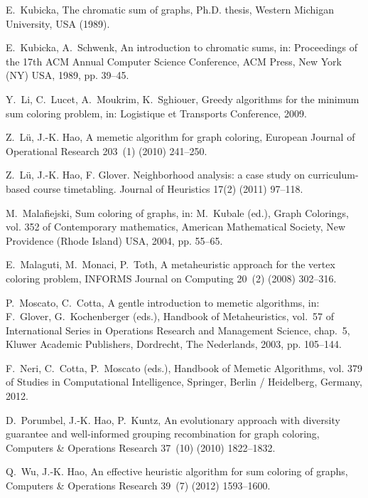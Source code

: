 \documentclass{elsart}
\begin{document}
\begin{thebibliography}{10}
E.~Kubicka, The chromatic sum of graphs, Ph.D. thesis, Western Michigan
  University, USA (1989).

E.~Kubicka, A.~Schwenk, An introduction to chromatic sums, in: Proceedings of
  the 17th ACM Annual Computer Science Conference, ACM Press, New York (NY)
  USA, 1989, pp. 39--45.

Y.~Li, C.~Lucet, A.~Moukrim, K.~Sghiouer, Greedy algorithms for the minimum sum
  coloring problem, in: Logistique et Transports Conference, 2009.

Z.~L\"u, J.-K. Hao, A memetic algorithm for graph coloring, European Journal of
  Operational Research 203~(1) (2010) 241--250.

Z.~L\"u, J.-K. Hao, F. Glover. Neighborhood analysis: a case study on curriculum-based course timetabling. Journal of Heuristics 17(2) (2011)  97--118.


M.~Malafiejski, Sum coloring of graphs, in: M.~Kubale (ed.), Graph Colorings,
  vol. 352 of Contemporary mathematics, American Mathematical Society, New
  Providence (Rhode Island) USA, 2004, pp. 55--65.

E.~Malaguti, M.~Monaci, P.~Toth, A metaheuristic approach for the vertex
  coloring problem, INFORMS Journal on Computing 20~(2) (2008) 302--316.

P.~Moscato, C.~Cotta, A gentle introduction to memetic algorithms, in:
  F.~Glover, G.~Kochenberger (eds.), Handbook of Metaheuristics, vol.~57 of
  International Series in Operations Research and Management Science, chap.~5,
  Kluwer Academic Publishers, Dordrecht, The Nederlands, 2003, pp. 105--144.

F.~Neri, C.~Cotta, P.~Moscato (eds.), Handbook of Memetic Algorithms, vol. 379
  of Studies in Computational Intelligence, Springer, Berlin / Heidelberg,
  Germany, 2012.


D.~Porumbel, J.-K. Hao, P.~Kuntz, An evolutionary approach with diversity
  guarantee and well-informed grouping recombination for graph coloring,
  Computers \& Operations Research 37~(10) (2010) 1822--1832.

Q.~Wu, J.-K. Hao, An effective heuristic algorithm for sum coloring of graphs,
  Computers \& Operations Research 39~(7) (2012) 1593--1600.

\end{thebibliography}
\end{document}
